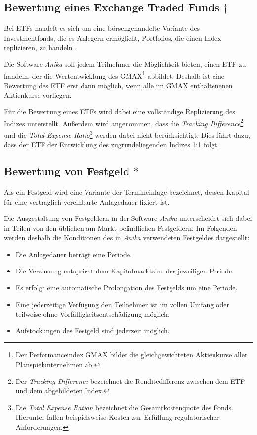 \documentclass[12pt, a4paper]{article}
\begin{document}

\subsection{Bewertung eines Exchange Traded Funds $\dagger$}
\label{sec:bewertung_eines_exchange_traded_funds}
Bei \glspl{ETF} handelt es sich um eine börsengehandelte Variante des Investmentfonds, die es Anlegern ermöglicht, Portfolios, die einen Index replizieren, zu handeln \autocite[][S.~103]{bodie_investments_2018}.

Die Software \textit{Anika} soll jedem Teilnehmer die Möglichkeit bieten, einen ETF zu handeln, der die Wertentwicklung des GMAX\footnote{Der Performanceindex GMAX bildet die gleichgewichteten Aktienkurse aller Planspielunternehmen ab.} abbildet.
Deshalb ist eine Bewertung des ETF erst dann möglich, wenn alle im GMAX enthaltenenen Aktienkurse vorliegen.

Für die Bewertung eines \glspl{ETF} wird dabei eine vollständige Replizierung des Indizes unterstellt. Außerdem wird angenommen, dass die \textit{Tracking Difference}\footnote{Der \textit{Tracking Difference} bezeichnet die Renditedifferenz zwischen dem \gls{ETF} und dem abgebildeten Index.} und die \textit{Total Expense Ratio}\footnote{Die \textit{Total Expense Ration} bezeichnet die Gesamtkostenquote des Fonds. Hierunter fallen beispielsweise Kosten zur Erfüllung regulatorischer Anforderungen.} werden dabei nicht berücksichtigt.
Dies führt dazu, dass der \gls{ETF} der Entwicklung des zugrundeliegenden Indizes 1:1 folgt.

\subsection{Bewertung von Festgeld $\ast$}
\label{sec:bewertung_von_festgeldern}

Als ein Festgeld wird eine Variante der Termineinlage bezeichnet, dessen Kapital für eine vertraglich vereinbarte Anlagedauer fixiert ist.

Die Ausgestaltung von Festgeldern in der Software \textit{Anika} unterscheidet sich dabei in Teilen von den üblichen am Markt befindlichen Festgeldern. Im Folgenden werden deshalb die Konditionen des in \textit{Anika} verwendeten Festgeldes dargestellt:
\begin{itemize}
	\item Die Anlagedauer beträgt eine Periode.
	\item Die Verzinsung entspricht dem Kapitalmarktzins der jeweiligen Periode.
	\item Es erfolgt eine automatische Prolongation des Festgelds um eine Periode.
	\item Eine jederzeitige Verfügung den Teilnehmer ist im vollen Umfang oder teilweise ohne Vorfälligkeitsentschädigung möglich.
	\item Aufstockungen des Festgeld sind jederzeit möglich.
\end{itemize}
\end{document}

